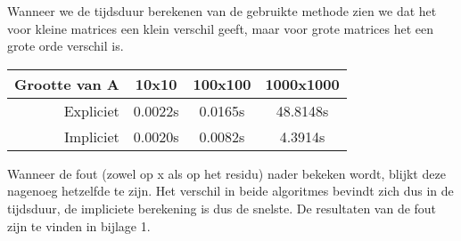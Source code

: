 Wanneer we de tijdsduur berekenen van de gebruikte methode zien we dat het voor kleine matrices een klein verschil geeft, maar voor grote matrices het een grote orde verschil is.\\[12pt]

\centering
\begin{tabular}{|r|c|c|c|}
\hline
Grootte van A & 10x10 & 100x100 & 1000x1000\\ \hline
Expliciet & 0.0022s & 0.0165s & 48.8148s\\ \hline
Impliciet & 0.0020s & 0.0082s & 4.3914s\\ \hline
\end{tabular}
\centering
{}
\label{Tijd Householder}

\begin{flushleft}
Wanneer de fout (zowel op x als op het residu) nader bekeken wordt, blijkt deze nagenoeg hetzelfde te zijn. Het verschil in beide algoritmes bevindt zich dus in de tijdsduur, de impliciete berekening is dus de snelste. De resultaten van de fout zijn te vinden in bijlage 1.\\[12pt]
\end{flushleft}
